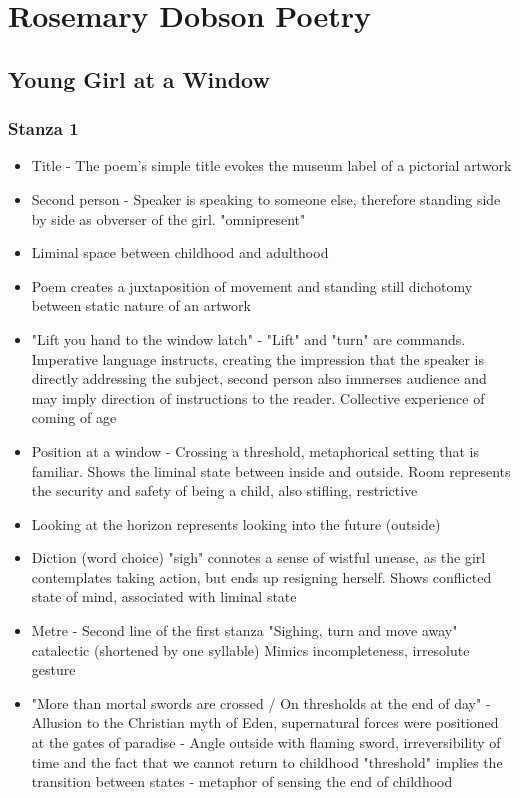 
\chapter{Rosemary Dobson Poetry}

\section{Young Girl at a Window} \label{1/11/2024}
	\subsection{Stanza 1}
		\begin{itemize}
			\item Title - The poem's simple title evokes the museum label of a pictorial artwork
			\item Second person - Speaker is speaking to someone else, therefore standing side by side as obverser of the girl. "omnipresent"
			\item Liminal space between childhood and adulthood
			\item Poem creates a juxtaposition of movement and standing still
				\subitem dichotomy between static nature of an artwork
			\item "Lift you hand to the window latch" - "Lift" and "turn" are commands. Imperative language instructs, creating the impression that the speaker is directly addressing the subject, second person also immerses audience and may imply direction of instructions to the reader. Collective experience of coming of age
			\item Position at a window - Crossing a threshold, metaphorical setting that is familiar. Shows the liminal state between inside and outside. Room represents the security and safety of being a child, also stifling, restrictive
			\item Looking at the horizon represents looking into the future (outside)
			\item Diction (word choice) "sigh" connotes a sense of wistful unease, as the girl contemplates taking action, but ends up resigning herself. Shows conflicted state of mind, associated with liminal state
			\item Metre - Second line of the first stanza "Sighing, turn and move away" catalectic (shortened by one syllable) Mimics incompleteness, irresolute gesture
			\item "More than mortal swords are crossed / On thresholds at the end of day" - Allusion to the Christian myth of Eden, supernatural forces were positioned at the gates of paradise - Angle outside with flaming sword, irreversibility of time and the fact that we cannot return to childhood "threshold" implies the transition between states - metaphor of sensing the end of childhood

\end{itemize}
